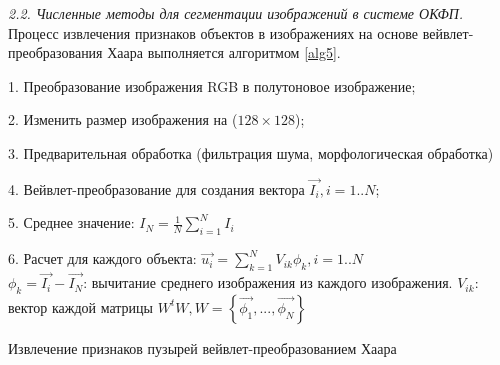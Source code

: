 \textit{2.2. Численные методы для сегментации изображений в системе ОКФП.} Процесс извлечения признаков объектов в изображениях на основе вейвлет-преобразования Хаара выполняется алгоритмом \ref{alg5}.%
%
%
%
%
%
%
%

\begin{algorithm}[ht!]
		1. Преобразование изображения RGB в полутоновое изображение;
		
		2. Изменить размер изображения на ($128 \times 128$);
		
		3. Предварительная обработка (фильтрация шума, морфологическая обработка)
		
		4. Вейвлет-преобразование для создания вектора $\vec{I_i}, i=1..N$;
		
		5. Среднее значение: $I_N=\frac{1}{N}\sum_{i=1}^N I_i$
		
		6. Расчет для каждого объекта: $\vec{u_i}=\sum_{k=1}^N V_{ik} \phi_k, i=1..N$\\
		$\phi_k=\vec{I_i}-\vec{I_N}$: вычитание среднего изображения из каждого изображения.
			$V_{ik}$: вектор каждой матрицы $W^tW, W=\left\{\vec{\phi_1},...,\vec{\phi_N}\right\} $
  \caption{Извлечение признаков пузырей вейвлет-преобразованием Хаара}\label{alg5}
\end{algorithm}

